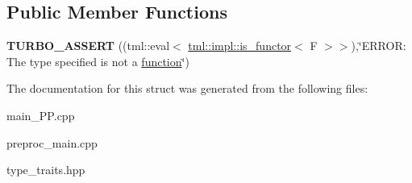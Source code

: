 \subsection*{Public Member Functions}
\begin{DoxyCompactItemize}
\item 
\hypertarget{structtml_1_1impl_1_1function__signature_addb12edd4ab0aaddd0633efe5863ce33}{{\bfseries T\+U\+R\+B\+O\+\_\+\+A\+S\+S\+E\+R\+T} ((tml\+::eval$<$ \hyperlink{structtml_1_1impl_1_1is__functor}{tml\+::impl\+::is\+\_\+functor}$<$ F $>$$>$),\char`\"{}E\+R\+R\+O\+R\+: The type specified is not a \hyperlink{structtml_1_1function}{function}\char`\"{})}\label{structtml_1_1impl_1_1function__signature_addb12edd4ab0aaddd0633efe5863ce33}

\end{DoxyCompactItemize}


The documentation for this struct was generated from the following files\+:\begin{DoxyCompactItemize}
\item 
main\+\_\+\+P\+P.\+cpp\item 
preproc\+\_\+main.\+cpp\item 
type\+\_\+traits.\+hpp\end{DoxyCompactItemize}
